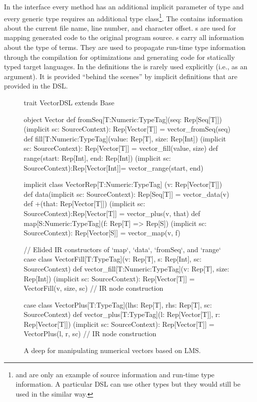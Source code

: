 In the  interface every method has an additional implicit
parameter of type  and every generic type requires an
additional  type class\footnote{ and  are only an example of source information and run-time type information. A particular DSL can use other types but they would still be used in the similar way.}. The  contains information about the current file name, line number, and character offset.
s are used for mapping generated code to the original
program source. s carry all information about the type of terms.
They are used to propagate run-time type information through the \edsl{}
compilation for optimizations and generating code for statically typed target
languages. In the \edsl definitions the  is rarely used
explicitly (i.e., as an argument). It is provided ``behind the scenes'' by implicit
definitions that are provided in the DSL.

\begin{figure}
\begin{listingtiny}


trait VectorDSL extends Base {
  object Vector {
    def fromSeq[T:Numeric:TypeTag](seq: Rep[Seq[T]])
      (implicit sc: SourceContext): Rep[Vector[T]] =
      vector_fromSeq(seq)
    def fill[T:Numeric:TypeTag](value: Rep[T], size: Rep[Int])
      (implicit sc: SourceContext): Rep[Vector[T]] =
      vector_fill(value, size)
    def range(start: Rep[Int], end: Rep[Int])
      (implicit sc: SourceContext):Rep[Vector[Int]]=
      vector_range(start, end)
  }

  implicit class VectorRep[T:Numeric:TypeTag]
    (v: Rep[Vector[T]]) {
    def data(implicit sc: SourceContext): Rep[Seq[T]] =
      vector_data(v)
    def +(that: Rep[Vector[T]])
      (implicit sc: SourceContext):Rep[Vector[T]] =
      vector_plus(v, that)
    def map[S:Numeric:TypeTag](f: Rep[T] => Rep[S])
      (implicit sc: SourceContext): Rep[Vector[S]] =
      vector_map(v, f)
  }

  // Elided IR constructors of `map`, `data`, `fromSeq`, and `range`
  case class VectorFill[T:TypeTag](v: Rep[T], s: Rep[Int],
    sc: SourceContext)
  def vector_fill[T:Numeric:TypeTag](v: Rep[T], size: Rep[Int])
    (implicit sc: SourceContext): Rep[Vector[T]] =
    VectorFill(v, size, sc) // IR node construction

  case class VectorPlus[T:TypeTag](lhs: Rep[T], rhs: Rep[T],
    sc: SourceContext)
  def vector_plus[T:TypeTag](l: Rep[Vector[T]], r: Rep[Vector[T]])
    (implicit sc: SourceContext): Rep[Vector[T]] =
    VectorPlus(l, r, sc) // IR node construction
}
\end{listingtiny}
\caption{\label{lst:vector_deep} A deep \edsl{} for manipulating numerical vectors based on LMS.}
\end{figure}

